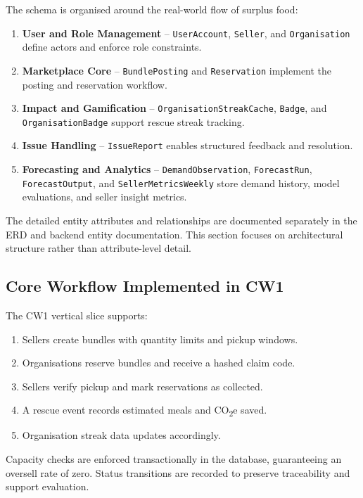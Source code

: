 \documentclass[11pt, a4paper]{report}
\begin{document}
The schema is organised around the real-world flow of surplus food:

\begin{enumerate}
\item \textbf{User and Role Management} -- \texttt{UserAccount}, \texttt{Seller}, and \texttt{Organisation} define actors and enforce role constraints.
\item \textbf{Marketplace Core} -- \texttt{BundlePosting} and \texttt{Reservation} implement the posting and reservation workflow.
\item \textbf{Impact and Gamification} -- \texttt{OrganisationStreakCache}, \texttt{Badge}, and \texttt{OrganisationBadge} support rescue streak tracking.
\item \textbf{Issue Handling} -- \texttt{IssueReport} enables structured feedback and resolution.
\item \textbf{Forecasting and Analytics} -- \texttt{DemandObservation}, \texttt{ForecastRun}, \texttt{ForecastOutput}, and \texttt{SellerMetricsWeekly} store demand history, model evaluations, and seller insight metrics.
\end{enumerate}

The detailed entity attributes and relationships are documented separately in the ERD and backend entity documentation. This section focuses on architectural structure rather than attribute-level detail.

\subsection{Core Workflow Implemented in CW1}

The CW1 vertical slice supports:

\begin{enumerate}
\item Sellers create bundles with quantity limits and pickup windows.
\item Organisations reserve bundles and receive a hashed claim code.
\item Sellers verify pickup and mark reservations as collected.
\item A rescue event records estimated meals and CO\textsubscript{2}e saved.
\item Organisation streak data updates accordingly.
\end{enumerate}

Capacity checks are enforced transactionally in the database, guaranteeing an oversell rate of zero. Status transitions are recorded to preserve traceability and support evaluation.
\end{document}
